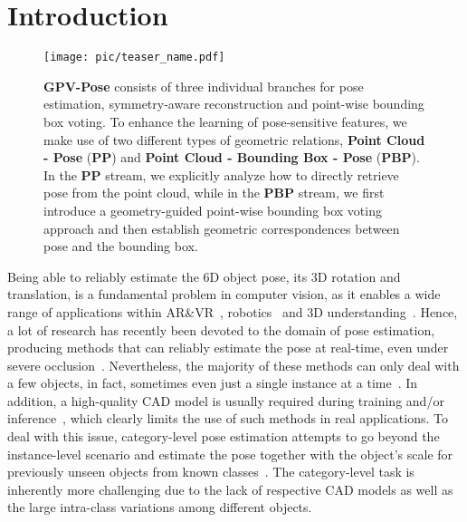 \documentclass[10pt,twocolumn,letterpaper]{article}
\begin{document}
\section{Introduction}

\begin{figure}[t]
  \centering
  \texttt{[image: pic/teaser\_name.pdf]}
  \caption{\textbf{GPV-Pose} consists of three individual branches for pose estimation, symmetry-aware reconstruction and point-wise bounding box voting.
  To enhance the learning of pose-sensitive features, we make use of two different types of geometric relations, \ie \textbf{Point Cloud - Pose} (\textbf{PP}) and \textbf{Point Cloud - Bounding Box - Pose} (\textbf{PBP}). 
  In the \textbf{PP} stream, we explicitly analyze how to directly retrieve pose from the point cloud, while in the \textbf{PBP} stream, we first introduce a geometry-guided point-wise bounding box voting approach and then establish geometric correspondences  between pose and the bounding box.
  }
  \label{teaser}
\end{figure}

Being able to reliably estimate the 6D object pose, \ie its 3D rotation and translation, is a fundamental problem in computer vision, as it enables a wide range of applications within AR\&VR~\cite{arvr}, robotics~\cite{robotics} and 3D understanding~\cite{nie2020total3dunderstanding, zhang2021holistic}. 
Hence, a lot of research has recently been devoted to the domain of pose estimation, producing methods that can reliably estimate the pose at real-time, even under severe occlusion~\cite{hybridpose,densefusion,GDRN,sopose}. 
Nevertheless, the majority of these methods can only deal with a few objects, in fact, sometimes even just a single instance at a time~\cite{labbe2020cosypose,Kehl2017}.
In addition, a high-quality CAD model is usually required during training and/or inference~\cite{Kehl2017,zakharov2019dpod}, which clearly limits the use of such methods in real applications. 
To deal with this issue, category-level pose estimation attempts to go beyond the instance-level scenario and estimate the pose together with the object's scale for previously unseen objects from known classes~\cite{NOCS,cass}. 
The category-level task is inherently more challenging due to the lack of respective CAD models as well as the large intra-class variations among different objects. 
\end{document}
